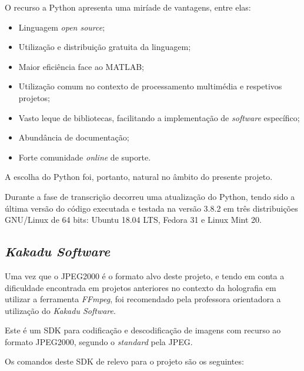 
O recurso a Python apresenta uma miríade de vantagens, entre elas:
\begin{itemize}
    \item Linguagem \textit{open source};
    \item Utilização e distribuição gratuita da linguagem;
    \item Maior eficiência face ao MATLAB;
    \item Utilização comum no contexto de processamento multimédia e respetivos projetos;
    \item Vasto leque de bibliotecas, facilitando a implementação de \textit{software} específico;
    \item Abundância de documentação;
    \item Forte comunidade \textit{online} de suporte.
\end{itemize}

A escolha do Python foi, portanto, natural no âmbito do presente projeto.

Durante a fase de transcrição decorreu uma atualização do Python, tendo sido a última versão do código executada e testada na versão 3.8.2 em três distribuições GNU/Linux de 64 bits: Ubuntu 18.04 LTS, Fedora 31 e Linux Mint 20.

\subsection{\textit{Kakadu Software}}
\label{ssec::tecno-ferr:tecno-ferr:kdu}
Uma vez que o JPEG2000 é o formato alvo deste projeto, e tendo em conta a dificuldade encontrada em projetos anteriores no contexto da holografia em utilizar a ferramenta \textit{FFmpeg}, foi recomendado pela professora orientadora a utilização do \textit{Kakadu Software}.

Este é um \ac{SDK} para codificação e descodificação de imagens com recurso ao formato JPEG2000, segundo o \textit{standard} pela \ac{JPEG}.

Os comandos deste \ac{SDK} de relevo para o projeto são os seguintes:

